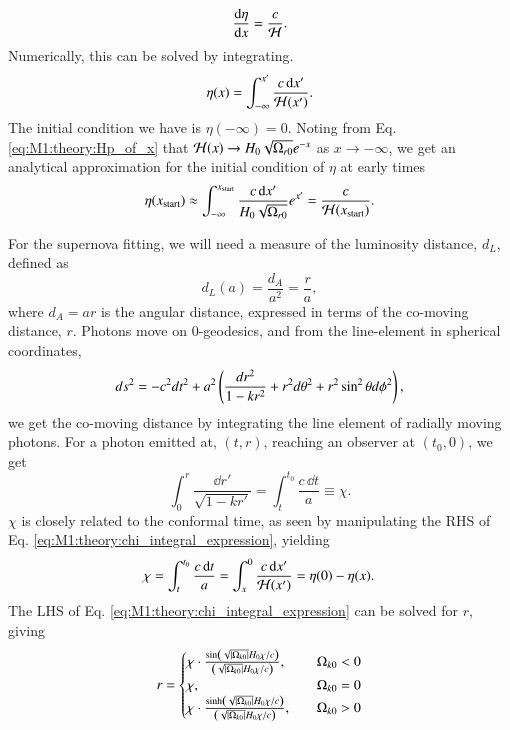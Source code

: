 \begin{equation}
    \dv{\eta}{x} = \frac{c}{\mathcal{H}}. \label{eq:M1:theory:deta_dx}
\end{equation}
Numerically, this can be solved by integrating. 
\begin{equation}
    \eta(x) = \int_{-\infty}^{x'} \frac{c\,\dd x'}{\mathcal{H}(x')}. \label{eq:M1:theory:eta_of_x_integral_expression}
\end{equation}
%
The initial condition we have is $\eta(-\infty)=0$. Noting from Eq. \eqref{eq:M1:theory:Hp_of_x} that $\mathcal{H}(x)\to H_0\sqrt{\Omega_{r0}}e^{-x}$ as $x\to-\infty$, we get an analytical approximation for the initial condition of $\eta$ at early times 
\begin{align}
    \eta(x_\mathrm{start}) \approx \int_{-\infty}^{x_\mathrm{start}} \frac{c\,\dd x'}{H_0\sqrt{\Omega_{r0}}} e^{x'} = \frac{c}{\mathcal{H}(x_\mathrm{start})}. \label{eq:M1:theory:eta_of_xstart_analytical_approximation}
\end{align} 
%

For the supernova fitting, we will need a measure of the luminosity distance, $d_L$, defined as 
\begin{equation}
    d_L(a) = \frac{d_A}{a^2} = \frac{r}{a}, \label{eq:m1:theory:dL_of_a_general expression}
\end{equation} 
where $d_A=ar$ is the angular distance, expressed in terms of the co-moving distance, $r$. Photons move on $0$-geodesics, and from the line-element in spherical coordinates,
\begin{equation}
    ds^2 = -c^2 dt^2 + a^2 \left( \frac{dr^2}{1-kr^2} + r^2 d\theta^2 + r^2 \sin^2\theta d\phi^2 \right), \label{eq:M1:theory:FLRW_general_nonflat_spherical}
\end{equation} 
we get the co-moving distance by integrating the line element of radially moving photons. For a photon emitted at, $(t,r)$, reaching an observer at $(t_0, 0)$, we get 
\begin{equation}
    \int_0^r \frac{\dd r'}{\sqrt{1-k r'}} = \int_t^{t_0} \frac{c\,\dd t}{a}\equiv\chi. \label{eq:M1:theory:chi_integral_expression}
\end{equation} 
$\chi$ is closely related to the conformal time, as seen by manipulating the RHS of Eq. \eqref{eq:M1:theory:chi_integral_expression}, yielding  
\begin{equation}
    \chi = \int_t^{t_0} \frac{c\,\dd t}{a} = \int_x^0 \frac{c\,\dd x'}{\mathcal{H}(x')} = \eta(0) - \eta(x). \label{eq:M1:theory:chi_eta0_minus_eta_of_x}
\end{equation}
The LHS of Eq. \eqref{eq:M1:theory:chi_integral_expression} can be solved for $r$, giving 
\begin{equation}
    r = \begin{cases}
        \chi\cdot \frac{\sin\left( \sqrt{\abs{\Omega_{k0}}} H_0 \chi / c \right)}{\left( \sqrt{\abs{\Omega_{k0}}} H_0 \chi / c \right)},\quad &\Omega_{k0} < 0 \\ 
        \chi,\quad &\Omega_{k0}=0 \\ 
        \chi\cdot \frac{\sinh\left( \sqrt{\abs{\Omega_{k0}}} H_0 \chi / c \right)}{\left( \sqrt{\abs{\Omega_{k0}}} H_0 \chi / c \right)},\quad &\Omega_{k0} > 0
    \end{cases}
\end{equation} 

